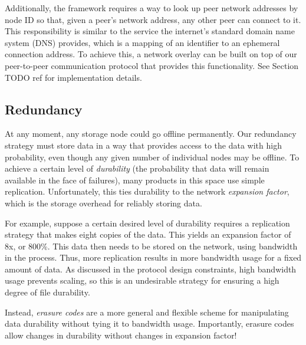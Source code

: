 \documentclass[a4paper,10pt]{article} \usepackage[utf8]{inputenc}
\newcommand{\todo}[1]{{\color{red} TODO #1 }}
\begin{document}
Additionally, the framework requires a way to look up peer network addresses
by node ID so that, given a peer's network address, any other peer can connect
to it. This responsibility is similar to the service the internet's standard
domain name system (DNS) provides, which is a mapping of an identifier to an
ephemeral connection address. To achieve this, a network overlay can be
built on top of our peer-to-peer communication protocol that provides this
functionality. See Section \todo{ref} for implementation details.

\subsection{Redundancy}

At any moment, any storage node could go offline permanently. Our redundancy
strategy must store data in a way that provides access to the data with high
probability, even though any given number of individual nodes may be offline. To
achieve a certain level of {\em durability} (the probability that data will
remain available in the face of failures), many products in this space use
simple replication. Unfortunately, this ties durability to the network {\em
expansion factor}, which is the storage overhead for reliably storing data.

For example, suppose a certain desired level of durability requires a
replication strategy that makes eight copies of the data. This yields an
expansion factor of 8x, or 800\%. This data then needs to be stored on the
network, using bandwidth in the process. Thus, more replication results in more
bandwidth usage for a fixed amount of data. As discussed in the protocol design
constraints, high bandwidth usage prevents scaling, so this is an undesirable
strategy for ensuring a high degree of file durability.

Instead, {\em erasure
codes} are a more general and flexible scheme for manipulating data
durability without tying it to bandwidth usage. Importantly, erasure codes allow
changes in durability without changes in expansion factor!
\end{document}
